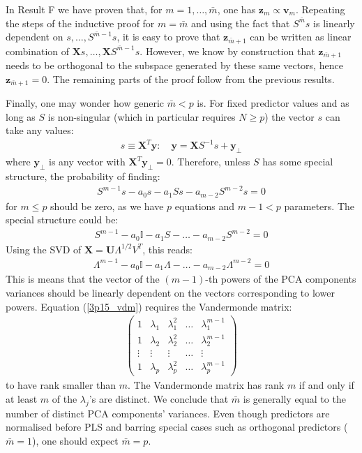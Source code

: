 \noindent In Result F we have proven that, for $m = 1, \ldots, \bar{m}$, one has $\mathbf{z}_m \propto \mathbf{v}_m$. Repeating the steps of the inductive proof for $m = \bar{m}$ and using the fact that
$S^{\bar{m}} s$ is linearly dependent on $s, \ldots, S^{\bar{m} -1}s$, it is easy to prove
that $\mathbf{z}_{\bar{m} + 1}$ can be written as linear combination of $\mathbf{X}s, \ldots, \mathbf{X}S^{\bar{m} - 1}s$. However, we know by construction that $\mathbf{z}_{\bar{m} + 1}$ needs
to be orthogonal to the subspace generated by these same vectors, hence $\mathbf{z}_{\bar{m} + 1} = 0$.
The remaining parts of the proof follow from the previous results.

\vspace{0.5cm} Finally, one may wonder how generic $\bar{m} < p$ is. For fixed predictor values and as long as $S$ is non-singular (which in particular requires $N \geq p$) the vector $s$ can take any values:
\begin{eqnarray*}
s \equiv \mathbf{X}^T \mathbf{y}: \quad \mathbf{y} = \mathbf{X} S^{-1} s + \mathbf{y}_\perp
\end{eqnarray*}
where $\mathbf{y}_\perp$ is any vector with $\mathbf{X}^T \mathbf{y}_\perp = 0$. Therefore, unless
$S$ has some special structure, the probability of finding:
\begin{eqnarray*}
S^{m - 1} s - a_0 s - a_1 S s - a_{m - 2} S^{m - 2} s = 0
\end{eqnarray*}
for $m \leq p$ should be zero, as we have $p$ equations and $m - 1 < p$ parameters. The special structure could be:
\begin{eqnarray*}
S^{m - 1} - a_0 \mathbb{I} - a_1 S - \ldots - a_{m - 2} S^{m - 2} = 0
\end{eqnarray*}
Using the SVD of $\mathbf{X} = \mathbf{U} \Lambda^{1/2} V^T$, this reads:
\begin{eqnarray} \label{3p15_vdm}
\Lambda^{m - 1} - a_0 \mathbb{I} - a_1 \Lambda - \ldots - a_{m - 2} \Lambda^{m-2} = 0
\end{eqnarray}
This is means that the vector of the $(m - 1)$-th powers of the PCA components variances should be linearly dependent on the vectors corresponding to lower powers. Equation (\ref{3p15_vdm}) requires the Vandermonde matrix:
\begin{eqnarray*}
\left(
\begin{array}{ccccc}
1 & \lambda_1 & \lambda_1^2 & \ldots & \lambda_{1}^{m - 1}\\
1 & \lambda_2 & \lambda_2^2 & \ldots & \lambda_{2}^{m - 1}\\
\vdots & \vdots & \vdots & \ldots & \vdots\\
1 & \lambda_p & \lambda_p^2 & \ldots & \lambda_{p}^{m - 1}
\end{array}
\right)
\end{eqnarray*}
to have rank smaller than $m$. The Vandermonde
matrix has rank $m$ if and only if at least $m$ of the $\lambda_j$'s are distinct.
We conclude that $\bar{m}$ is generally equal to the number of distinct PCA components' variances. Even though predictors are normalised before
PLS and barring special cases such as orthogonal predictors ($\bar{m} = 1$), one should expect $\bar{m} = p$.

